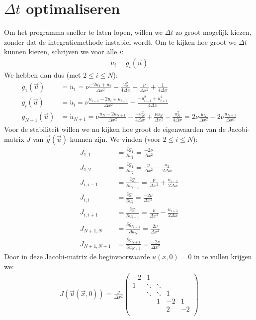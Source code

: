 \documentclass{article}
\newcommand{\Dt}{\Delta t}
\begin{document}
\section*{$\Dt$ optimaliseren}
Om het programma sneller te laten lopen, willen we $\Dt
$ zo groot mogelijk kiezen, zonder dat de integratiemethode instabiel wordt.
Om te kijken hoe groot we $\Dt$ kunnen kiezen, schrijven we voor alle $i$:
\begin{align*}
\dot{u}_i =g_i(\vec{u})
\end{align*}
We hebben dan dus (met $2\leq i \leq N$):
\begin{align*}
g_1(\vec{u})&=\dot{u}_1 = \nu \frac{-2u_1+u_2}{\Delta x^2} -\frac{u_2^2}{4\Delta x} -\frac{\nu}{\Delta x^2} +\frac{1}{4\Delta x}\\
g_i(\vec{u})&=\dot{u}_i = \nu \frac{u_{i-1}-2u_i+u_{i+1}}{\Delta x^2} -\frac{-u_{i-1}^2+u_{i+1}^2}{4\Delta x}\\
g_{N+1}(\vec{u})&=\dot{u}_{N+1} = \nu \frac{u_{N}-2u_{N+1}}{\Delta x^2} -\frac{-u_N^2}{4\Delta x} +\frac{\nu u_N}{\Delta x^2} -\frac{u_N^2}{4\Delta x}
=2\nu \frac{u_N}{\Delta x^2} -2\nu\frac{u_{N+1}}{\Delta x^2}
\end{align*}
Voor de stabiliteit willen we nu kijken hoe groot de eigenwaarden van de Jacobi-matrix $J$ van $\vec{g}(\vec{u})$ kunnen zijn.
We vinden (voor $2\leq i\leq N$):
\begin{align*}
J_{1,1} &= \frac{\partial g_1}{\partial u_1} = \frac{-2\nu}{\Delta x^2}\\
J_{1,2} &= \frac{\partial g_1}{\partial u_2} = \frac{\nu}{\Delta x^2} -\frac{u_2}{2\Delta x}\\
J_{i,i-1} &= \frac{\partial g_i}{\partial u_{i-1}} = \frac{\nu}{\Delta x^2}+\frac{u_{i-1}}{2\Delta x}\\
J_{i,i} &= \frac{\partial g_i}{\partial u_i} = \frac{-2\nu}{\Delta x^2}\\
J_{i,i+1} &= \frac{\partial g_i}{\partial u_{i+1}} = \frac{\nu}{\Delta x^2} -\frac{u_{i+1}}{2\Delta x}\\
J_{N+1,N} &= \frac{\partial g_{N+1}}{\partial u_N} =  \frac{2\nu}{\Delta x^2}\\
J_{N+1,N+1} &= \frac{\partial g_{N+1}}{\partial u_{N+1}} = \frac{-2\nu}{\Delta x^2}
\end{align*}
Door in deze Jacobi-matrix de beginvoorwaarde $u(x,0) =0$ in te vullen krijgen we:
\begin{align*}
J(\vec{u}(\vec{x},0)) = \frac{\nu}{\Delta x^2}
\begin{pmatrix}
-2 & 1 & &&\\
1 &\ddots &\ddots&&\\
&\ddots &\ddots&1&\\
& &1&-2&1\\
& &&2&-2\\
\end{pmatrix}
\end{align*}
\end{document}
